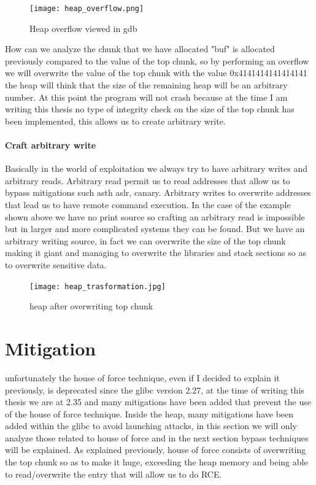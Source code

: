 \documentclass{report}
\begin{document}
        \begin{figure}[htbp]
        \centering
        \texttt{[image: heap\_overflow.png]}
        \caption{Heap overflow viewed in gdb }
        \label{fig:enter-label}
    \end{figure}
    How can we analyze the chunk that we have allocated "buf" is allocated previously compared to the value of the top chunk, so by performing an overflow we will overwrite the value of the top chunk with the value 0x4141414141414141
    the heap will think that the size of the remaining heap will be an arbitrary number.\newline
    At this point the program will not crash because at the time I am writing this thesis no type of integrity check on the size of the top chunk has been implemented, this allows us to create arbitrary write.
    \clearpage
    \paragraph{Craft arbitrary write}
    Basically in the world of exploitation we always try to have arbitrary writes and arbitrary reads.\newline
    Arbitrary read permit us to read addresses that allow us to bypass mitigations such asth aslr, canary. \newline
    Arbitrary writes to overwrite addresses that lead us to have remote command execution.
    In the case of the example shown above we have no print source so crafting an arbitrary read is impossible but in larger and more complicated systems they can be found. \newline
    But we have an arbitrary writing source, in fact we can overwrite the size of the top chunk making it giant and managing to overwrite the libraries and stack sections so as to overwrite sensitive data.
    \begin{figure}[htbp]
        \centering
        \texttt{[image: heap\_trasformation.jpg]}
        \caption{heap after overwriting top chunk}
        \label{fig:enter-label}
    \end{figure}
    \section{Mitigation}
    unfortunately the house of force technique, even if I decided to explain it previously, is deprecated since the glibc version 2.27, at the time of writing this thesis we are at 2.35 and many mitigations have been added that prevent the use of the house of force technique.\newline
    Inside the heap, many mitigations have been added within the glibc to avoid launching attacks, in this section we will only analyze those related to house of force and in the next section bypass techniques will be explained.\newline
    As explained previously, house of force consists of overwriting the top chunk so as to make it huge, exceeding the heap memory and being able to read/overwrite the entry that will allow us to do RCE.\newline
\end{document}
